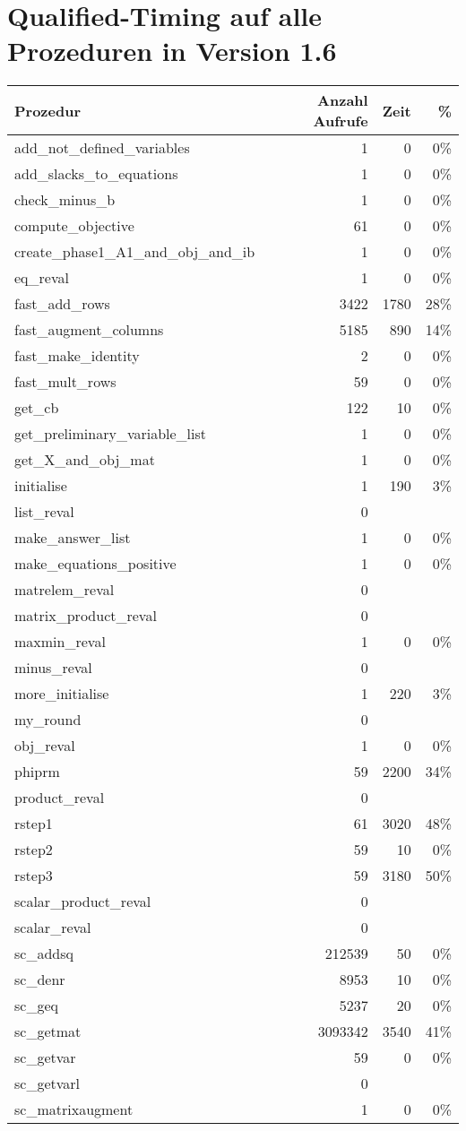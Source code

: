 \documentclass[a4paper]{article}
\begin{document}
\section{Qualified-Timing auf alle Prozeduren in Version 1.6}

\begin{tabular}{lrrr}
Prozedur & Anzahl Aufrufe & Zeit & \% \\
\hline
add\_not\_defined\_variables & 1 & 0 & 0\% \\
add\_slacks\_to\_equations & 1 & 0 & 0\% \\
check\_minus\_b & 1 & 0 & 0\% \\
compute\_objective & 61 & 0 & 0\% \\
create\_phase1\_A1\_and\_obj\_and\_ib & 1 & 0 & 0\% \\
eq\_reval & 1 & 0 & 0\% \\
fast\_add\_rows & 3422 & 1780 & 28\% \\
fast\_augment\_columns & 5185 & 890 & 14\% \\
fast\_make\_identity & 2 & 0 & 0\% \\
fast\_mult\_rows & 59 & 0 & 0\% \\
get\_cb & 122 & 10 & 0\% \\
get\_preliminary\_variable\_list & 1 & 0 & 0\% \\
get\_X\_and\_obj\_mat & 1 & 0 & 0\% \\
initialise & 1 & 190 & 3\% \\
list\_reval & 0 &  &  \\
make\_answer\_list & 1 & 0 & 0\% \\
make\_equations\_positive & 1 & 0 & 0\% \\
matrelem\_reval & 0 &  &  \\
matrix\_product\_reval & 0 &  &  \\
maxmin\_reval & 1 & 0 & 0\% \\
minus\_reval & 0 &  &  \\
more\_initialise & 1 & 220 & 3\% \\
my\_round & 0 &  &  \\
obj\_reval & 1 & 0 & 0\% \\
phiprm & 59 & 2200 & 34\% \\
product\_reval & 0 &  &  \\
rstep1 & 61 & 3020 & 48\% \\
rstep2 & 59 & 10 & 0\% \\
rstep3 & 59 & 3180 & 50\% \\
scalar\_product\_reval & 0 &  &  \\
scalar\_reval & 0 &  &  \\
sc\_addsq & 212539 & 50 & 0\% \\
sc\_denr & 8953 & 10 & 0\% \\
sc\_geq & 5237 & 20 & 0\% \\
sc\_getmat & 3093342 & 3540 & 41\% \\
sc\_getvar & 59 & 0 & 0\% \\
sc\_getvarl & 0 &  &  \\
sc\_matrixaugment & 1 & 0 & 0\% \\
\end{tabular} \\
\end{document}

